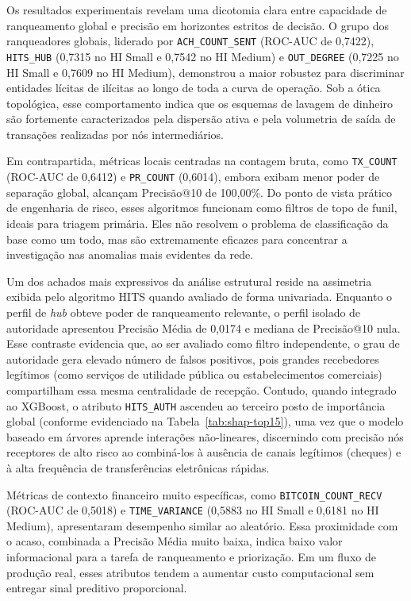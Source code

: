 \documentclass[titlepage,a4paper,oneside,onecolumn,12pt]{report}
\begin{document}
Os resultados experimentais revelam uma dicotomia clara entre capacidade de ranqueamento global e precisão em horizontes estritos de decisão. O grupo dos ranqueadores globais, liderado por \texttt{ACH\_COUNT\_SENT} (ROC-AUC de 0,7422), \texttt{HITS\_HUB} (0,7315 no HI Small e 0,7542 no HI Medium) e \texttt{OUT\_DEGREE} (0,7225 no HI Small e 0,7609 no HI Medium), demonstrou a maior robustez para discriminar entidades lícitas de ilícitas ao longo de toda a curva de operação. Sob a ótica topológica, esse comportamento indica que os esquemas de lavagem de dinheiro são fortemente caracterizados pela dispersão ativa e pela volumetria de saída de transações realizadas por nós intermediários.

Em contrapartida, métricas locais centradas na contagem bruta, como \texttt{TX\_COUNT} (ROC-AUC de 0,6412) e \texttt{PR\_COUNT} (0,6014), embora exibam menor poder de separação global, alcançam Precisão@10 de 100,00\%. Do ponto de vista prático de engenharia de risco, esses algoritmos funcionam como filtros de topo de funil, ideais para triagem primária. Eles não resolvem o problema de classificação da base como um todo, mas são extremamente eficazes para concentrar a investigação nas anomalias mais evidentes da rede.

Um dos achados mais expressivos da análise estrutural reside na assimetria exibida pelo algoritmo HITS quando avaliado de forma univariada. Enquanto o perfil de \textit{hub} obteve poder de ranqueamento relevante, o perfil isolado de autoridade apresentou Precisão Média de 0,0174 e mediana de Precisão@10 nula. Esse contraste evidencia que, ao ser avaliado como filtro independente, o grau de autoridade gera elevado número de falsos positivos, pois grandes recebedores legítimos (como serviços de utilidade pública ou estabelecimentos comerciais) compartilham essa mesma centralidade de recepção. Contudo, quando integrado ao XGBoost, o atributo \texttt{HITS\_AUTH} ascendeu ao terceiro posto de importância global (conforme evidenciado na Tabela~\ref{tab:shap-top15}), uma vez que o modelo baseado em árvores aprende interações não-lineares, discernindo com precisão nós receptores de alto risco ao combiná-los à ausência de canais legítimos (cheques) e à alta frequência de transferências eletrônicas rápidas.

Métricas de contexto financeiro muito específicas, como \texttt{BITCOIN\_COUNT\_RECV} (ROC-AUC de 0,5018) e \texttt{TIME\_VARIANCE} (0,5883 no HI Small e 0,6181 no HI Medium), apresentaram desempenho similar ao aleatório. Essa proximidade com o acaso, combinada a Precisão Média muito baixa, indica baixo valor informacional para a tarefa de ranqueamento e priorização. Em um fluxo de produção real, esses atributos tendem a aumentar custo computacional sem entregar sinal preditivo proporcional.
\end{document}
